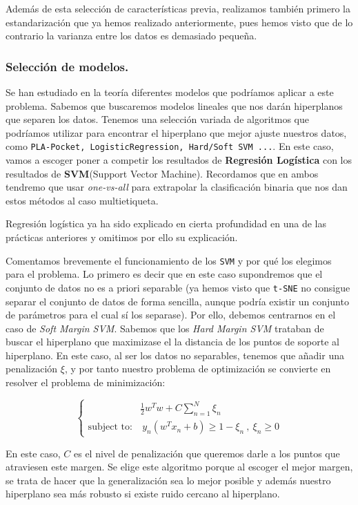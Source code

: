 \documentclass[a4paper, 20pt]{article}
\begin{document}
Además de esta selección de características previa, realizamos también primero la estandarización que ya hemos realizado anteriormente, pues hemos visto que de lo contrario la varianza entre los datos es demasiado pequeña.

\subsubsection{Selección de modelos.}

Se han estudiado en la teoría diferentes modelos que podríamos aplicar a este problema. Sabemos que buscaremos modelos lineales que nos darán hiperplanos que separen los datos. Tenemos una selección variada de algoritmos que podríamos utilizar para encontrar el hiperplano que mejor ajuste nuestros datos, como \lstinline{PLA-Pocket, LogisticRegression, Hard/Soft SVM ...}. En este caso, vamos a escoger poner a competir los resultados de \textbf{Regresión Logística} con los resultados de \textbf{SVM}(Support Vector Machine). Recordamos que en ambos tendremo que usar \emph{one-vs-all} para extrapolar la clasificación binaria que nos dan estos métodos al caso multietiqueta.

Regresión logística ya ha sido explicado en cierta profundidad en una de las prácticas anteriores \cite{saez_fjsaezmml_2021} y omitimos por ello su explicación.

Comentamos brevemente el funcionamiento de los \lstinline{SVM} y por qué los elegimos para el problema. Lo primero es decir que en este caso supondremos que el conjunto de datos no es a priori separable (ya hemos visto que \lstinline{t-SNE} no consigue separar el conjunto de datos de forma sencilla, aunque podría existir un conjunto de parámetros para el cual sí los separase). Por ello, debemos centrarnos en el caso de \emph{Soft Margin SVM}. Sabemos que los \emph{Hard Margin SVM} trataban de buscar el hiperplano que maximizase el la distancia de los puntos de soporte al hiperplano. En este caso, al ser los datos no separables, tenemos que añadir una penalización $\xi$, y por tanto nuestro problema de optimización se convierte en resolver el problema de minimización:

\[
\begin{cases}
  & \frac{1}{2}w^T w + C \sum_{n = 1}^N \xi_n \\
  \text{subject to:} & \ y_n(w^T x_n + b) \geq 1- \xi_n \ , \ \xi_n \geq 0
\end{cases}
\]

En este caso, $C$ es el nivel de penalización que queremos darle a los puntos que atraviesen este margen. Se elige este algoritmo porque al escoger el mejor margen, se trata de hacer que la generalización sea lo mejor posible y además nuestro hiperplano sea más robusto si existe ruido cercano al hiperplano.
\end{document}
